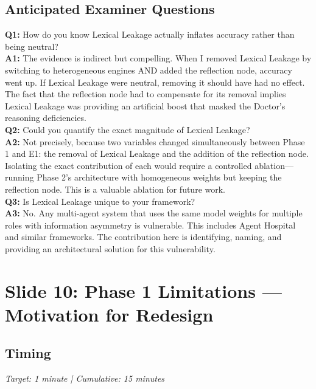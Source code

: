 \documentclass[12pt]{article}
\begin{document}
  \subsection*{Anticipated Examiner Questions}
  \begin{qabox}
  \textbf{Q1:} How do you know Lexical Leakage actually inflates accuracy rather than being neutral? \\
  \textbf{A1:} The evidence is indirect but compelling. When I removed Lexical Leakage by switching to heterogeneous engines AND added the reflection node, accuracy went up. If Lexical Leakage were neutral, removing it should have had no effect. The fact that the reflection node had to compensate for its removal implies Lexical Leakage was providing an artificial boost that masked the Doctor's reasoning deficiencies. \\[6pt]
  \textbf{Q2:} Could you quantify the exact magnitude of Lexical Leakage? \\
  \textbf{A2:} Not precisely, because two variables changed simultaneously between Phase 1 and E1: the removal of Lexical Leakage and the addition of the reflection node. Isolating the exact contribution of each would require a controlled ablation---running Phase 2's architecture with homogeneous weights but keeping the reflection node. This is a valuable ablation for future work. \\[6pt]
  \textbf{Q3:} Is Lexical Leakage unique to your framework? \\
  \textbf{A3:} No. Any multi-agent system that uses the same model weights for multiple roles with information asymmetry is vulnerable. This includes Agent Hospital and similar frameworks. The contribution here is identifying, naming, and providing an architectural solution for this vulnerability.
  \end{qabox}



  \section{Slide 10: Phase 1 Limitations --- Motivation for Redesign}

  \subsection*{Timing}
  \textit{Target: 1 minute | Cumulative: 15 minutes}
\end{document}
